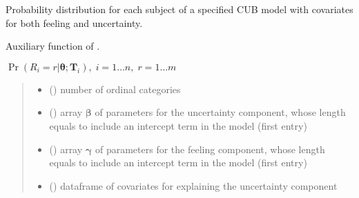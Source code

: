 \documentclass[letterpaper,10pt,english]{sphinxmanual}
\begin{document}

\begin{fulllineitems}
\label{\detokenize{cubmods:cubmods.cub_yw.pmfi}}
\pysigstartsignatures
{}
\pysigstopsignatures
\sphinxAtStartPar
Probability distribution for each subject of a specified CUB model 
with covariates for both feeling and uncertainty.

\sphinxAtStartPar
Auxiliary function of .

\sphinxAtStartPar
\(\Pr(R_i=r|\pmb\theta; \pmb T_i),\; i=1 \ldots n ,\; r=1 \ldots m\)
\begin{quote}\begin{description}
\begin{itemize}
\item {} 
\sphinxAtStartPar
{} () \textendash{} number of ordinal categories

\item {} 
\sphinxAtStartPar
{} () \textendash{} array \(\pmb \beta\) of parameters for the uncertainty component, whose length equals 
 to include an intercept term in the model (first entry)

\item {} 
\sphinxAtStartPar
{} () \textendash{} array \(\pmb \gamma\) of parameters for the feeling component, whose length equals 
 to include an intercept term in the model (first entry)

\item {} 
\sphinxAtStartPar
{} () \textendash{} dataframe of covariates for explaining the uncertainty component


\end{itemize}
\end{description}
\end{quote}
\end{fulllineitems}
\end{document}

